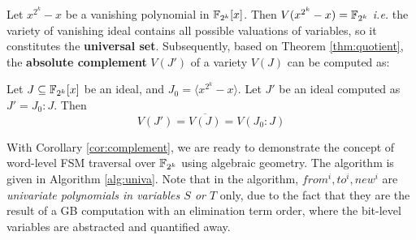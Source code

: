 
Let $x^{2^k}-x$ be a vanishing polynomial in ${\mathbb{F}}_{2^k}[x]$. Then $V(x^{2^k}-x)={\mathbb{F}}_{2^k}$
{\it i.e.} the variety of vanishing ideal contains
 all possible valuations of variables, so it constitutes the {\bf
   universal set}. Subsequently, based on Theorem \ref{thm:quotient},
 the {\bf absolute complement} $V(J')$ of a variety $V(J)$ can be
 computed as: 

\begin{Corollary} \label{cor:complement}
Let $J\subseteq {\mathbb{F}}_{2^k}[x]$ be an ideal, and $J_0=\langle x^{2^k}-x\rangle$. Let $J'$ be an ideal 
computed as $J' = J_0:J$. Then $$V(J') = \overline{V(J)} = {V}(J_0:J)$$
\end{Corollary}

With Corollary \ref{cor:complement}, we are ready to demonstrate the
concept of word-level FSM traversal over ${\mathbb{F}}_{2^k}$ using algebraic
geometry. The algorithm is given in Algorithm \ref{alg:univa}. Note that in
the algorithm, $from^i, to^i, new^i$ are {\it univariate polynomials in variables $S$
or $T$} only, due to the fact that they are the result of a GB
computation with an elimination term order, where the bit-level 
variables are abstracted and quantified away.

